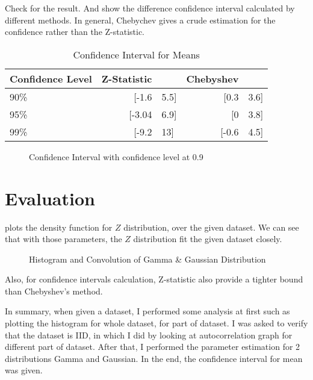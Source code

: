 \documentclass[conference]{IEEEtran}
\begin{document}
Check  for the result. And  show the difference confidence interval calculated by different methods. In general, Chebychev gives a crude estimation for the confidence rather than the Z-statistic.

\begin{table}
\centering
\caption{Confidence Interval for Means}
\label{confidence_interval}
\begin{tabular}{l|rl|rl}
\toprule
Confidence Level & Z-Statistic &  & Chebyshev \\
 \midrule
90\% & [-1.6 & 5.5] & [0.3 & 3.6] \\
95\% & [-3.04 & 6.9] & [0 & 3.8] \\
99\% & [-9.2 & 13] & [-0.6 & 4.5] \\
\end{tabular}
\end{table}

\begin{figure}
    \centering
	\caption{Confidence Interval with confidence level at 0.9}
	\label{pic_ci}
\end{figure}


\section{Evaluation}

 plots the density function for $Z$ distribution, over the given dataset. We can see that with those parameters, the $Z$ distribution fit the given dataset closely.

\begin{figure}
    \centering
	\caption{Histogram and Convolution of Gamma \& Gaussian Distribution}
	\label{hist}
\end{figure}

Also, for confidence intervals calculation, Z-statistic also provide a tighter bound than Chebyshev's method.

In summary, when given a dataset, I performed some analysis at first such as plotting the histogram for whole dataset, for part of dataset. I was asked to verify that the dataset is IID, in which I did by looking at autocorrelation graph for different part of dataset. After that, I performed the parameter estimation for 2 distributions Gamma and Gaussian. In the end, the confidence interval for mean was given.




\end{document}
